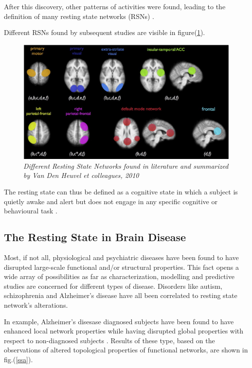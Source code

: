 \documentclass[12pt,openright,twoside,a4paper]{book}
\begin{document}
After this discovery, other patterns of activities were found, leading to the definition of many resting state networks (RSNs) \cite{RNS}.

Different RSNs found by subsequent studies are visible in figure(\ref{resting-nws}).

\begin{figure}[!h]
\centering
\includegraphics[scale=0.6]{resting-nws}
\caption{\textit{Different Resting State Networks found in literature and summarized by Van Den Heuvel et colleagues, 2010 \cite{RNS}}}
\label{resting-nws}
\end{figure}

The resting state can thus be defined as a cognitive state in which a subject is quietly awake and alert but does not engage in any specific cognitive or behavioural task \cite{Rest-NTW}.

\clearpage

\subsection{The Resting State in Brain Disease}

Most, if not all, physiological and psychiatric diseases have been found to have disrupted large-scale functional and/or structural properties.
This fact opens a wide array of possibilities as far as characterization, modelling and predictive studies are concerned for different types of disease.
Disorders like autism, schizophrenia and Alzheimer's disease have all been correlated to resting state network's alterations.

In example, Alzheimer's disesase diagnosed subjects have been found to have enhanced local network properties while having disrupted global properties with respect to non-diagnosed subjects \cite{ssa}.
Results of these type, based on the observations of altered topological properties of functional networks, are shown in fig.(\ref{ssa}).
\end{document}
